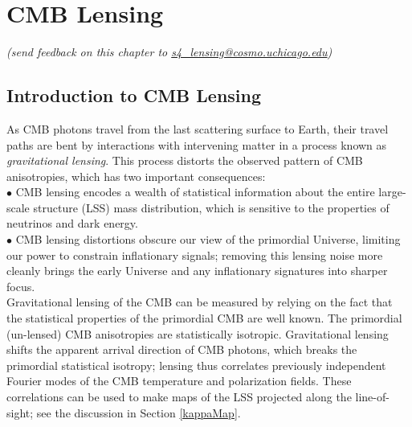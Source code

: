  
\chapter{CMB Lensing}

\begin{center}
{\small \it (send feedback on this chapter to \href{mailto:s4_lensing@cosmo.uchicago.edu}{s4\_lensing@cosmo.uchicago.edu})}
\end{center}



\def\nnu{N_{\mathrm eff}}
\def\gtrsim{\raise-.75ex\hbox{$\buildrel>\over\sim$}}

\section{Introduction to CMB Lensing}
\label{sec:lensing_intro}

As CMB photons travel from the last scattering surface to Earth, their travel paths are bent by interactions with intervening matter in a process known as \textit{gravitational lensing}.
This process distorts the observed pattern of CMB anisotropies, which has two important consequences:\\
 
$\bullet$ CMB lensing encodes a wealth of statistical information about the entire large-scale structure (LSS) mass distribution, which is sensitive to the properties of neutrinos and dark energy.\\

$\bullet$ CMB lensing distortions obscure our view of the primordial Universe, limiting our power to constrain inflationary signals; removing this lensing noise more cleanly brings the early Universe and any inflationary signatures into sharper focus.\\


Gravitational lensing of the CMB can be measured by relying on the fact that the statistical properties of the primordial CMB are well known.
The primordial (un-lensed) CMB anisotropies are statistically isotropic.
Gravitational lensing shifts the apparent arrival direction of CMB photons, which breaks the primordial statistical isotropy;
lensing thus correlates previously independent Fourier modes of the CMB temperature and polarization fields.
These correlations can be used to make maps of the LSS projected along the line-of-sight; see the discussion in Section \ref{kappaMap}.

